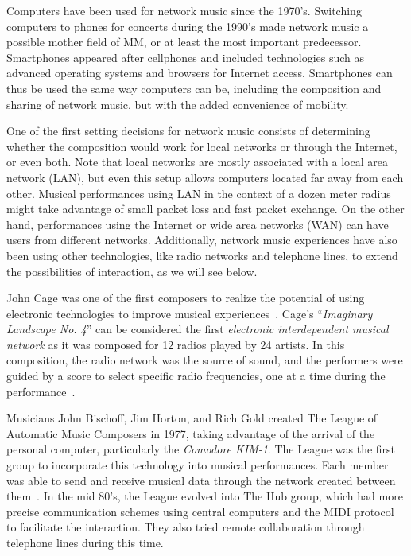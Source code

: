 Computers have been used for network music since the 1970's.
Switching computers to phones for concerts during the 1990's made network music a possible mother field of MM, or at least the most important predecessor.
Smartphones appeared after cellphones and included technologies such as advanced operating systems and browsers for Internet access.
Smartphones can thus be used the same way computers can be, including the composition and sharing of network music, but with the added convenience of mobility.

One of the first setting decisions for network music consists of determining whether the composition would work for local networks or through the Internet, or even both.
Note that local networks are mostly associated with a local area network (LAN), but even this setup allows computers located far away from each other.
Musical performances using LAN in the context of a dozen meter radius might take advantage of small packet loss and fast packet exchange.
On the other hand, performances using the Internet or wide area networks (WAN) can have users from different networks.
Additionally, network music experiences have also been using other technologies, like radio networks and telephone lines, to extend the possibilities of interaction, as we will see below.

John Cage was one of the first composers to realize the potential of using electronic technologies to improve musical experiences~\citep[p.~16-17]{Weinberg2003}.
Cage's ``\textit{Imaginary Landscape No. 4}'' can be considered the first \textit{electronic interdependent musical network} as it was composed for 12 radios played by 24 artists.
In this composition, the radio network was the source of sound, and the performers were guided by a score to select specific radio frequencies, one at a time during the performance~\citep[p.~24-25]{Weinberg2003}. 

Musicians John Bischoff, Jim Horton, and Rich Gold created The League of Automatic Music Composers in 1977, taking advantage of the arrival of the personal computer, particularly the \textit{Comodore KIM-1}.
The League was the first group to incorporate this technology into musical performances.
Each member was able to send and receive musical data through the network created between them~\citep[p.~29]{Weinberg2003}.
In the mid 80's, the League evolved into The Hub group, which had more precise communication schemes using central computers and the MIDI protocol to facilitate the interaction.
They also tried remote collaboration through telephone lines during this time.

